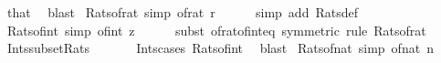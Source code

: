 \begin{isabellebody}
\ that\ \isamarkupfalse%
\ blast\isanewline
{}\isamarkupfalse%
%
\endisatagproof
{\isafoldproof}%
%
\isadelimproof
\isanewline
%
\endisadelimproof
\isanewline
{}\isamarkupfalse%
\ Rats{\isacharunderscore}{\kern0pt}of{\isacharunderscore}{\kern0pt}rat\ {\isacharbrackleft}{\kern0pt}simp{\isacharbrackright}{\kern0pt}{\isacharcolon}{\kern0pt}\ {\isachardoublequoteopen}of{\isacharunderscore}{\kern0pt}rat\ r\ {\isasymin}\ {\isasymrat}{\isachardoublequoteclose}\isanewline
%
\isadelimproof
\ \ %
\endisadelimproof
%
\isatagproof
{}\isamarkupfalse%
\ {\isacharparenleft}{\kern0pt}simp\ add{\isacharcolon}{\kern0pt}\ Rats{\isacharunderscore}{\kern0pt}def{\isacharparenright}{\kern0pt}%
\endisatagproof
{\isafoldproof}%
%
\isadelimproof
\isanewline
%
\endisadelimproof
\isanewline
{}\isamarkupfalse%
\ Rats{\isacharunderscore}{\kern0pt}of{\isacharunderscore}{\kern0pt}int\ {\isacharbrackleft}{\kern0pt}simp{\isacharbrackright}{\kern0pt}{\isacharcolon}{\kern0pt}\ {\isachardoublequoteopen}of{\isacharunderscore}{\kern0pt}int\ z\ {\isasymin}\ {\isasymrat}{\isachardoublequoteclose}\isanewline
%
\isadelimproof
\ \ %
\endisadelimproof
%
\isatagproof
{}\isamarkupfalse%
\ {\isacharparenleft}{\kern0pt}subst\ of{\isacharunderscore}{\kern0pt}rat{\isacharunderscore}{\kern0pt}of{\isacharunderscore}{\kern0pt}int{\isacharunderscore}{\kern0pt}eq\ {\isacharbrackleft}{\kern0pt}symmetric{\isacharbrackright}{\kern0pt}{\isacharparenright}{\kern0pt}\ {\isacharparenleft}{\kern0pt}rule\ Rats{\isacharunderscore}{\kern0pt}of{\isacharunderscore}{\kern0pt}rat{\isacharparenright}{\kern0pt}%
\endisatagproof
{\isafoldproof}%
%
\isadelimproof
\isanewline
%
\endisadelimproof
\isanewline
{}\isamarkupfalse%
\ Ints{\isacharunderscore}{\kern0pt}subset{\isacharunderscore}{\kern0pt}Rats{\isacharcolon}{\kern0pt}\ {\isachardoublequoteopen}{\isasymint}\ {\isasymsubseteq}\ {\isasymrat}{\isachardoublequoteclose}\isanewline
%
\isadelimproof
\ \ %
\endisadelimproof
%
\isatagproof
{}\isamarkupfalse%
\ Ints{\isacharunderscore}{\kern0pt}cases\ Rats{\isacharunderscore}{\kern0pt}of{\isacharunderscore}{\kern0pt}int\ \isamarkupfalse%
\ blast%
\endisatagproof
{\isafoldproof}%
%
\isadelimproof
\isanewline
%
\endisadelimproof
\isanewline
{}\isamarkupfalse%
\ Rats{\isacharunderscore}{\kern0pt}of{\isacharunderscore}{\kern0pt}nat\ {\isacharbrackleft}{\kern0pt}simp{\isacharbrackright}{\kern0pt}{\isacharcolon}{\kern0pt}\ {\isachardoublequoteopen}of{\isacharunderscore}{\kern0pt}nat\ n\ {\isasymin}\ {\isasymrat}{\isachardoublequoteclose}\isanewline

\end{isabellebody}
